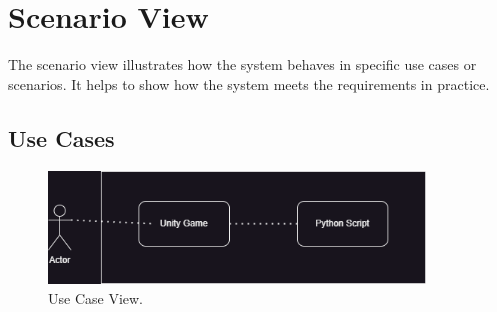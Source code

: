 \section{Scenario View}

The scenario view illustrates how the system behaves in specific use cases or scenarios. 
It helps to show how the system meets the requirements in practice.

\subsection{Use Cases}

\begin{figure}[htb]
    \centering
    \includegraphics[width=10cm]{Images/ProjectHier.png}
       \caption{Use Case View.}
           \label{Fig:TomTomHier}
\end{figure}